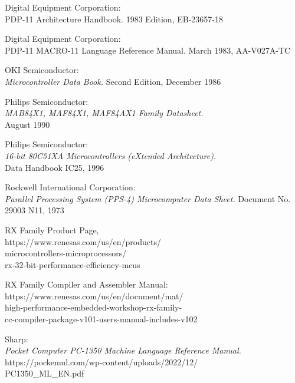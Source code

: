  Digital Equipment Corporation: \\
                  { PDP-11 Architecture Handbook.}
                  1983 Edition, EB-23657-18

 Digital Equipment Corporation: \\
                  { PDP-11 MACRO-11 Language Reference Manual.}
                  March 1983, AA-V027A-TC

 OKI Semiconductor: \\
                {\em Microcontroller Data Book.\/}
                Second Edition, December 1986

 Philips Semiconductor: \\
                 {\em MAB84X1, MAF84X1, MAF84AX1 Family Datasheet.} \\
                 August 1990

 Philips Semiconductor: \\
                 {\em 16-bit 80C51XA Microcontrollers (eXtended
                  Architecture).\/} \\
                 Data Handbook IC25, 1996

 Rockwell International Corporation: \\
                  {\em Parallel Processing System (PPS-4) Microcomputer Data Sheet.}
                 Document No. 29003 N11, 1973

 RX Family Product Page, \\
                 https://www.renesas.com/us/en/products/ \\
                 microcontrollers-microprocessors/ \\
                 rx-32-bit-performance-efficiency-mcus

 RX Family Compiler and Assembler Manual: \\
                 https://www.renesas.com/us/en/document/mat/ \\
                 high-performance-embedded-workshop-rx-family-\\
                 cc-compiler-package-v101-users-manual-includes-v102

 Sharp: \\
                 {\em Pocket Computer PC-1350 Machine Language Reference Manual.} \\
                 https://pockemul.com/wp-content/uploads/2022/12/ \\
                 PC1350\_ML\_EN.pdf

